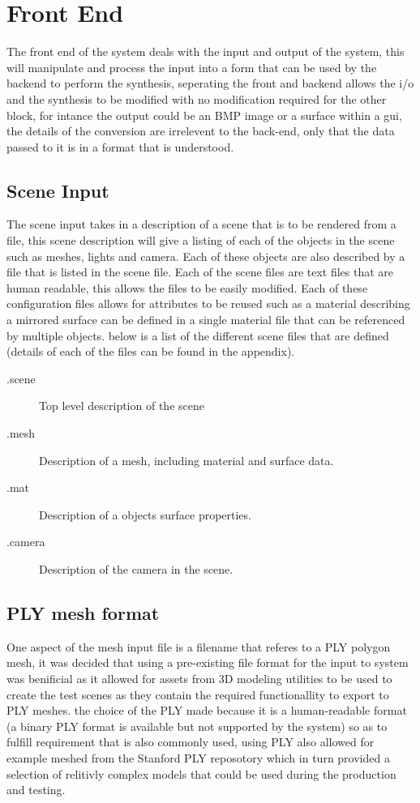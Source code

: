 \section{Front End}
The front end of the system deals with the input and output of the system, this will manipulate and process
the input into a form that can be used by the backend to perform the synthesis, seperating the front and backend
allows the i/o and the synthesis to be modified with no modification required for the other block,
for intance the output could be an BMP image or a surface within a gui, the details of the conversion are
irrelevent to the back-end, only that the data passed to it is in a format that is understood.

\subsection{Scene Input}
The scene input takes in a description of a scene that is to be rendered from a file, this scene description
will give a listing of each of the objects in the scene such as meshes, lights and camera. Each of these
objects are also described by a file that is listed in the scene file. Each of the scene files are text files
that are human readable, this allows the files to be easily modified. Each of these configuration files allows
for attributes to be reused such as a material describing a mirrored surface can be defined in a single material
file that can be referenced by multiple objects. below is a list of the different scene files that are defined
(details of each of the files can be found in the appendix).

\begin{description}
\item[.scene] Top level description of the scene
\item[.mesh] Description of a mesh, including material and surface data.
\item[.mat] Description of a objects surface properties.
\item[.camera] Description of the camera in the scene.
\end{description}

\subsection{PLY mesh format}
One aspect of the mesh input file is a filename that referes to a PLY polygon mesh, it was decided that using
a pre-existing file format for the input to system was benificial as it allowed for assets from 3D modeling
utilities to be used to create the test scenes as they contain the required functionallity to export to PLY
meshes. the choice of the PLY made because it is a human-readable format (a binary PLY format is available but
not supported by the system) so as to fulfill requirement  that is also commonly used,
using PLY also allowed for example meshed from the Stanford PLY reposotory which in turn provided a selection of
relitivly complex models that could be used during the production and testing.

